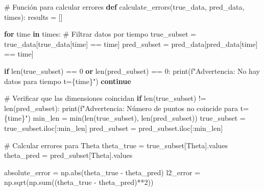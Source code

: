 \documentclass[
  spanish,
  us-letterpaper,
  DIV=11,
  numbers=noendperiod]{scrreprt}
\newenvironment{Shaded}{\begin{snugshade}}{\end{snugshade}}
\newcommand{\BuiltInTok}[1]{\textcolor[rgb]{0.00,0.23,0.31}{#1}}
\newcommand{\CommentTok}[1]{\textcolor[rgb]{0.37,0.37,0.37}{#1}}
\newcommand{\ControlFlowTok}[1]{\textcolor[rgb]{0.00,0.23,0.31}{\textbf{#1}}}
\newcommand{\DecValTok}[1]{\textcolor[rgb]{0.68,0.00,0.00}{#1}}
\newcommand{\KeywordTok}[1]{\textcolor[rgb]{0.00,0.23,0.31}{\textbf{#1}}}
\newcommand{\NormalTok}[1]{\textcolor[rgb]{0.00,0.23,0.31}{#1}}
\newcommand{\OperatorTok}[1]{\textcolor[rgb]{0.37,0.37,0.37}{#1}}
\newcommand{\SpecialCharTok}[1]{\textcolor[rgb]{0.37,0.37,0.37}{#1}}
\newcommand{\SpecialStringTok}[1]{\textcolor[rgb]{0.13,0.47,0.30}{#1}}
\newcommand{\StringTok}[1]{\textcolor[rgb]{0.13,0.47,0.30}{#1}}
\theoremstyle{definition}
\theoremstyle{plain}
\theoremstyle{remark}
\begin{document}
\begin{Shaded}
\begin{Highlighting}[]
\CommentTok{\# Función para calcular errores}
\KeywordTok{def}\NormalTok{ calculate\_errors(true\_data, pred\_data, times):}
\NormalTok{    results }\OperatorTok{=}\NormalTok{ []}
    
    \ControlFlowTok{for}\NormalTok{ time }\KeywordTok{in}\NormalTok{ times:}
        \CommentTok{\# Filtrar datos por tiempo}
\NormalTok{        true\_subset }\OperatorTok{=}\NormalTok{ true\_data[true\_data[}\StringTok{\textquotesingle{}time\textquotesingle{}}\NormalTok{] }\OperatorTok{==}\NormalTok{ time]}
\NormalTok{        pred\_subset }\OperatorTok{=}\NormalTok{ pred\_data[pred\_data[}\StringTok{\textquotesingle{}time\textquotesingle{}}\NormalTok{] }\OperatorTok{==}\NormalTok{ time]}
        
        \ControlFlowTok{if} \BuiltInTok{len}\NormalTok{(true\_subset) }\OperatorTok{==} \DecValTok{0} \KeywordTok{or} \BuiltInTok{len}\NormalTok{(pred\_subset) }\OperatorTok{==} \DecValTok{0}\NormalTok{:}
            \BuiltInTok{print}\NormalTok{(}\SpecialStringTok{f"Advertencia: No hay datos para tiempo t=}\SpecialCharTok{\{}\NormalTok{time}\SpecialCharTok{\}}\SpecialStringTok{"}\NormalTok{)}
            \ControlFlowTok{continue}
        
        \CommentTok{\# Verificar que las dimensiones coincidan}
        \ControlFlowTok{if} \BuiltInTok{len}\NormalTok{(true\_subset) }\OperatorTok{!=} \BuiltInTok{len}\NormalTok{(pred\_subset):}
            \BuiltInTok{print}\NormalTok{(}\SpecialStringTok{f"Advertencia: Número de puntos no coincide para t=}\SpecialCharTok{\{}\NormalTok{time}\SpecialCharTok{\}}\SpecialStringTok{"}\NormalTok{)}
\NormalTok{            min\_len }\OperatorTok{=} \BuiltInTok{min}\NormalTok{(}\BuiltInTok{len}\NormalTok{(true\_subset), }\BuiltInTok{len}\NormalTok{(pred\_subset))}
\NormalTok{            true\_subset }\OperatorTok{=}\NormalTok{ true\_subset.iloc[:min\_len]}
\NormalTok{            pred\_subset }\OperatorTok{=}\NormalTok{ pred\_subset.iloc[:min\_len]}
        
        \CommentTok{\# Calcular errores para Theta}
\NormalTok{        theta\_true }\OperatorTok{=}\NormalTok{ true\_subset[}\StringTok{\textquotesingle{}Theta\textquotesingle{}}\NormalTok{].values}
\NormalTok{        theta\_pred }\OperatorTok{=}\NormalTok{ pred\_subset[}\StringTok{\textquotesingle{}Theta\textquotesingle{}}\NormalTok{].values}
        
\NormalTok{        absolute\_error }\OperatorTok{=}\NormalTok{ np.}\BuiltInTok{abs}\NormalTok{(theta\_true }\OperatorTok{{-}}\NormalTok{ theta\_pred)}
\NormalTok{        l2\_error }\OperatorTok{=}\NormalTok{ np.sqrt(np.}\BuiltInTok{sum}\NormalTok{((theta\_true }\OperatorTok{{-}}\NormalTok{ theta\_pred)}\OperatorTok{**}\DecValTok{2}\NormalTok{))}
        

\end{Highlighting}
\end{Shaded}
\end{document}
